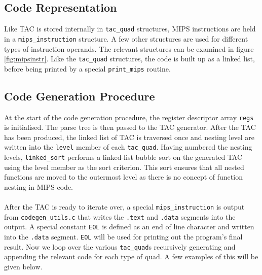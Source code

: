 \subsection{Code Representation}
Like TAC is stored internally in \verb!tac_quad! structures, MIPS instructions are held in a \verb!mips_instruction! structure. A few other structures are used for different types of instruction operands. The relevant structures can be examined in figure \ref{fig:mipsinstr}. Like the \verb!tac_quad! structures, the code is built up as a linked list, before being printed by a special \verb!print_mips! routine.

\subsection{Code Generation Procedure}
At the start of the code generation procedure, the register descriptor array \verb!regs! is initialised. The parse tree is then passed to the TAC generator. After the TAC has been produced, the linked list of TAC is traversed once and nesting level are written into the \verb!level! member of each \verb!tac_quad!. Having numbered the nesting levels, \verb!linked_sort! performs a linked-list bubble sort on the generated TAC using the level member as the sort criterion. This sort ensures that all nested functions are moved to the outermost level as there is no concept of function nesting in MIPS code.
\ \\ \ \\
After the TAC is ready to iterate over, a special \verb!mips_instruction! is output from \verb!codegen_utils.c! that writes the \verb!.text! and \verb!.data! segments into the output. A special constant \verb!EOL! is defined as an end of line character and written into the \verb!.data! segment. \verb!EOL! will be used for printing out the program's final result. Now we loop over the various \verb!tac_quad!s recursively generating and appending the relevant code for each type of quad. A few examples of this will be given below.

